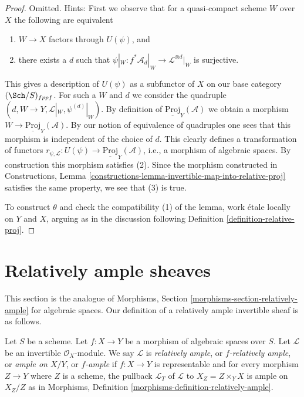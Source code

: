 \begin{proof}
Omitted. Hints:
First we observe that for a quasi-compact scheme
$W$ over $X$ the following are equivalent
\begin{enumerate}
\item $W \to X$ factors through $U(\psi)$, and
\item there exists a $d$ such that
$\psi|_W : f^*\mathcal{A}_d|_W \to \mathcal{L}^{\otimes d}|_W$
is surjective.
\end{enumerate}
This gives a description of $U(\psi)$ as a subfunctor of $X$
on our base category $(\Sch/S)_{fppf}$. For such a $W$ and $d$
we consider the quadruple
$(d, W \to Y, \mathcal{L}|_W, \psi^{(d)}|_W)$.
By definition of $\underline{\text{Proj}}_Y(\mathcal{A})$
we obtain a morphism $W \to \underline{\text{Proj}}_Y(\mathcal{A})$.
By our notion of equivalence of quadruples one sees that
this morphism is independent of the choice of $d$.
This clearly defines a transformation of functors
$r_{\psi, \mathcal{L}} : U(\psi) \to \underline{\text{Proj}}_Y(\mathcal{A})$,
i.e., a morphism of algebraic spaces.
By construction this morphism satisfies (2).
Since the morphism constructed in
Constructions, Lemma \ref{constructions-lemma-invertible-map-into-relative-proj}
satisfies the same property, we see that (3) is true.

\medskip\noindent
To construct $\theta$ and check the compatibility (1) of the
lemma, work \'etale locally on $Y$ and $X$, arguing as
in the discussion following
Definition \ref{definition-relative-proj}.
\end{proof}








\section{Relatively ample sheaves}
\label{section-relatively-ample}

\noindent
This section is the analogue of
Morphisms, Section \ref{morphisms-section-relatively-ample}
for algebraic spaces.
Our definition of a relatively ample invertible sheaf is as
follows.

\begin{definition}
\label{definition-relatively-ample}
Let $S$ be a scheme.
Let $f : X \to Y$ be a morphism of algebraic spaces over $S$.
Let $\mathcal{L}$ be an invertible $\mathcal{O}_X$-module.
We say $\mathcal{L}$ is {\it relatively ample}, or {\it $f$-relatively ample},
or {\it ample on $X/Y$}, or {\it $f$-ample} if $f : X \to Y$
is representable and for every morphism $Z \to Y$
where $Z$ is a scheme, the pullback $\mathcal{L}_T$ of $\mathcal{L}$
to $X_Z = Z \times_Y X$ is ample on $X_Z/Z$ as in
Morphisms, Definition \ref{morphisms-definition-relatively-ample}.
\end{definition}

